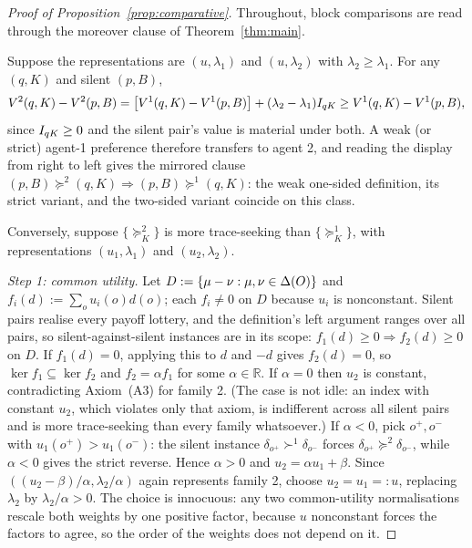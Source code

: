 \begin{proof}[Proof of Proposition~\ref{prop:comparative}]
Throughout, block comparisons are read through the moreover clause of Theorem~\ref{thm:main}.

Suppose the representations are $(u,\lambda_1)$ and $(u,\lambda_2)$ with $\lambda_2\ge\lambda_1$.  For any
$(q,K)$ and silent $(p,B)$,
\[
 V^2(q,K)-V^2(p,B)
 =\bigl[V^1(q,K)-V^1(p,B)\bigr]+(\lambda_2-\lambda_1)I_{qK}
 \ge V^1(q,K)-V^1(p,B),
\]
since $I_{qK}\ge0$ and the silent pair's value is material under both.  A weak (or strict) agent-1 preference
therefore transfers to agent 2, and reading the display from right to left gives the mirrored clause
$(p,B)\succeq^2(q,K)\Rightarrow(p,B)\succeq^1(q,K)$: the weak one-sided definition, its strict variant, and the
two-sided variant coincide on this class.

Conversely, suppose $\{\succeq^2_K\}$ is more trace-seeking than $\{\succeq^1_K\}$, with representations
$(u_1,\lambda_1)$ and $(u_2,\lambda_2)$.

\emph{Step 1: common utility.}  Let $D:=\{\mu-\nu:\mu,\nu\in\Delta(O)\}$ and $f_i(d):=\sum_ou_i(o)d(o)$; each
$f_i\ne0$ on $D$ because $u_i$ is nonconstant.  Silent pairs realise every payoff lottery, and the definition's
left argument ranges over all pairs, so silent-against-silent instances are in its scope:
$f_1(d)\ge0\Rightarrow f_2(d)\ge0$ on $D$.  If $f_1(d)=0$, applying this to $d$ and $-d$ gives $f_2(d)=0$, so
$\ker f_1\subseteq\ker f_2$ and $f_2=\alpha f_1$ for some $\alpha\in\mathbb R$.  If $\alpha=0$ then $u_2$ is
constant, contradicting Axiom~\textup{(A3)} for family 2.  (The case is not idle: an index with constant $u_2$,
which violates only that axiom, is indifferent across all silent pairs and is more trace-seeking than every
family whatsoever.)  If $\alpha<0$, pick $o^+,o^-$ with $u_1(o^+)>u_1(o^-)$: the silent instance
$\delta_{o^+}\succ^1\delta_{o^-}$ forces $\delta_{o^+}\succeq^2\delta_{o^-}$, while $\alpha<0$ gives the strict
reverse.  Hence $\alpha>0$ and $u_2=\alpha u_1+\beta$.  Since $((u_2-\beta)/\alpha,\lambda_2/\alpha)$ again
represents family 2, choose $u_2=u_1=:u$, replacing $\lambda_2$ by $\lambda_2/\alpha>0$.  The choice is
innocuous: any two common-utility normalisations rescale both weights by one positive factor, because
$u$ nonconstant forces the factors to agree, so the order of the weights does not depend on it.


\end{proof}
